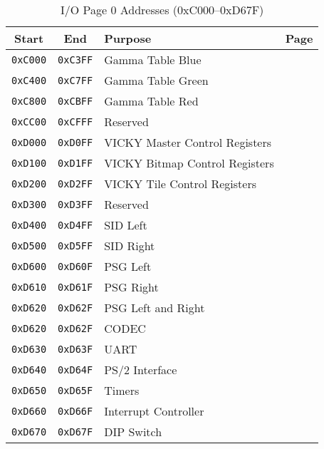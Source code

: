 \begin{table}[ht]
    \begin{center}
        \begin{tabular}{|c|c|l|l|} \hline
            Start & End & Purpose & Page \\ \hline \hline
            \verb+0xC000+ & \verb+0xC3FF+ & Gamma Table Blue & \multirow{3}{*}{\pageref{sec:gamma}} \\ \cline{1-3}
            \verb+0xC400+ & \verb+0xC7FF+ & Gamma Table Green & \\ \cline{1-3}
            \verb+0xC800+ & \verb+0xCBFF+ & Gamma Table Red & \\ \hline
            \verb+0xCC00+ & \verb+0xCFFF+ & Reserved & \\ \hline
            \verb+0xD000+ & \verb+0xD0FF+ & VICKY Master Control Registers & \pageref{tab:vky_master_ctrl_reg}\\ \hline
            \verb+0xD100+ & \verb+0xD1FF+ & VICKY Bitmap Control Registers & \pageref{tab:bm_registers} \\ \hline
            \verb+0xD200+ & \verb+0xD2FF+ & VICKY Tile Control Registers & \pageref{tab:tilemap_reg} \\ \hline
            \verb+0xD300+ & \verb+0xD3FF+ & Reserved & \\ \hline
            \verb+0xD400+ & \verb+0xD4FF+ & SID Left & \multirow{2}{*}{\pageref{tab:sid_registers}} \\ \cline{1-3}
            \verb+0xD500+ & \verb+0xD5FF+ & SID Right & \\ \hline
            \verb+0xD600+ & \verb+0xD60F+ & PSG Left & \multirow{3}{*}{\pageref{tab:psg_registers}} \\ \cline{1-3}
            \verb+0xD610+ & \verb+0xD61F+ & PSG Right & \\ \cline{1-3}
            \verb+0xD620+ & \verb+0xD62F+ & PSG Left and Right & \\ \hline
            \verb+0xD620+ & \verb+0xD62F+ & CODEC & \pageref{tab:codec_registers} \\ \hline
            \verb+0xD630+ & \verb+0xD63F+ & UART & \pageref{tab:uart_reg} \\ \hline
            \verb+0xD640+ & \verb+0xD64F+ & PS/2 Interface & \pageref{tab:ps2_reg} \\ \hline
            \verb+0xD650+ & \verb+0xD65F+ & Timers & \pageref{tab:timer_reg} \\ \hline
            \verb+0xD660+ & \verb+0xD66F+ & Interrupt Controller & \pageref{tab:interrupts} \\ \hline
            \verb+0xD670+ & \verb+0xD67F+ & DIP Switch & \pageref{tab:dip_reg} \\ \hline
        \end{tabular}
        \caption{I/O Page 0 Addresses (0xC000--0xD67F)}
        \label{tab:io_page_0}
    \end{center}
\end{table}

